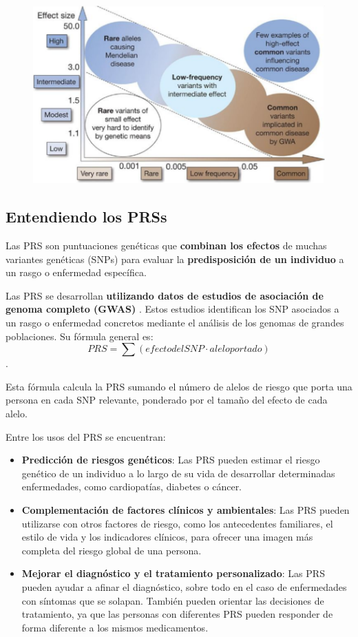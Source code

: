 \begin{figure}[htbp]
\centering
\includegraphics[width = 0.8 \textwidth]{figs/Imagen3.png}
\end{figure}

\subsection{Entendiendo los PRSs}
Las PRS son puntuaciones genéticas que \textbf{combinan los efectos} de muchas variantes genéticas (SNPs) para evaluar la \textbf{predisposición de un individuo} a un rasgo o enfermedad específica.

Las PRS se desarrollan \textbf{utilizando datos de estudios de asociación de genoma completo (GWAS)} . 	Estos estudios identifican los SNP asociados a un rasgo o enfermedad concretos mediante el análisis de los genomas de grandes poblaciones. Su fórmula general es:
$$PRS = \sum (efecto del SNP \cdot alelo portado)$$.

Esta fórmula calcula la PRS sumando el número de alelos de riesgo que porta una persona en cada SNP relevante, ponderado por el tamaño del efecto de cada alelo.

Entre los usos del PRS se encuentran:
\begin{itemize}
\item \textbf{Predicción de riesgos genéticos}: Las PRS pueden estimar el riesgo genético de un individuo a lo largo de su vida de desarrollar determinadas enfermedades, como cardiopatías, diabetes o cáncer.
\item \textbf{Complementación de factores clínicos y ambientales}: Las PRS pueden utilizarse con otros factores de riesgo, como los antecedentes familiares, el estilo de vida y los indicadores clínicos, para ofrecer una imagen más completa del riesgo global de una persona.
\item \textbf{Mejorar el diagnóstico y el tratamiento personalizado}: Las PRS pueden ayudar a afinar el diagnóstico, sobre todo en el caso de enfermedades con síntomas que se solapan. También pueden orientar las decisiones de tratamiento, ya que las personas con diferentes PRS pueden responder de forma diferente a los mismos medicamentos.
\end{itemize}

